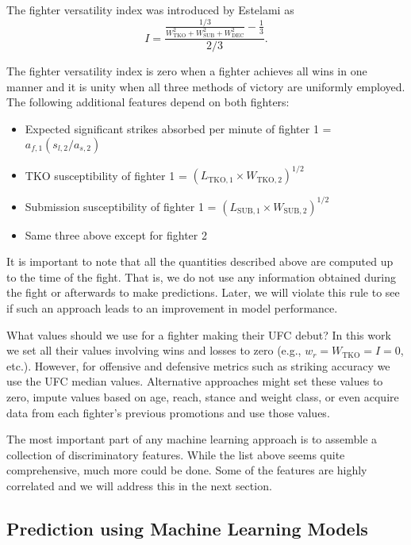\noindent
The fighter versatility index was introduced by Estelami as
\begin{equation}
I = \frac{\frac{1/3}{W_{\textrm{TKO}}^2+W_{\textrm{SUB}}^2+W_{\textrm{DEC}}^2}-\frac{1}{3}}{2/3}.
\end{equation}

\noindent
The fighter versatility index is zero when a fighter achieves all wins in one manner and
it is unity when all three methods of victory are uniformly employed.\\

\noindent
The following additional features depend on both fighters:

\begin{itemize}[noitemsep]
  \item Expected significant strikes absorbed per minute of fighter 1 = $a_{f,1} (s_{l,2}/a_{s,2})$
  \item TKO susceptibility of fighter 1 = $(L_{\textrm{TKO},1} \times W_{\textrm{TKO},2})^{1/2}$
  \item Submission susceptibility of fighter 1 = $(L_{\textrm{SUB},1} \times W_{\textrm{SUB},2})^{1/2}$
  \item Same three above except for fighter 2
\end{itemize}

It is important to note that all the quantities described above are computed
up to the time of the fight. That is, we do not use any information
obtained during the fight or afterwards to make predictions.
Later, we will violate this rule to see if such an approach
leads to an improvement in model performance.

What values should we use for a fighter making their UFC debut? In this work
we set all their values involving wins and losses to
zero (e.g., $w_r=W_{\textrm{TKO}}=I=0$, etc.). However, for
offensive and defensive metrics such as striking accuracy we use the UFC median values.
Alternative approaches might set these values to zero, impute values based
on age, reach, stance and weight class, or even acquire data from
each fighter's previous promotions and use those
values.

The most important part of any machine learning approach is
to assemble a collection of discriminatory features. While the
list above seems quite comprehensive, much more could be done.
Some of the features are highly correlated and
we will address this in the next section.


\subsection*{Prediction using Machine Learning Models}

